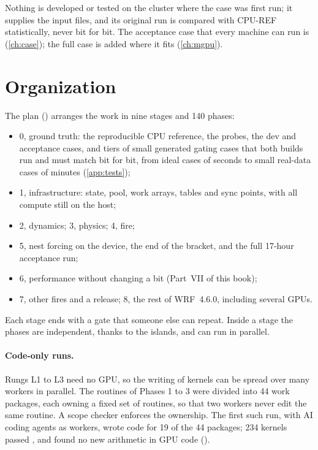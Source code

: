 Nothing is developed or tested on the cluster where the case was first run; it supplies the input files, and its
original run is compared with CPU-REF statistically, never bit for bit. The acceptance case that every machine can run
is  (\cref{ch:case}); the full case is added where it fits (\cref{ch:mgpu}).

\section{Organization}

The plan () arranges the work in nine stages and 140 phases:
\begin{itemize}
  \item 0, ground truth: the reproducible CPU reference, the probes, the dev and acceptance cases, and tiers of
    small generated gating cases that both builds run and must match bit for bit, from ideal cases of seconds to
    small real-data cases of minutes (\cref{app:tests});
  \item 1, infrastructure: state, pool, work arrays, tables and sync points, with all compute still on the host;
  \item 2, dynamics; 3, physics; 4, fire;
  \item 5, nest forcing on the device, the end of the bracket, and the full 17-hour acceptance run;
  \item 6, performance without changing a bit (Part~VII of this book);
  \item 7, other fires and a release; 8, the rest of WRF~4.6.0, including several GPUs.
\end{itemize}
Each stage ends with a gate that someone else can repeat. Inside a stage the phases are independent, thanks to the
islands, and can run in parallel.

\paragraph{Code-only runs.} Rungs L1 to L3 need no GPU, so the writing of kernels can be spread over many workers in
parallel. The routines of Phases 1 to 3 were divided into 44 work packages, each owning a fixed set of routines, so
that two workers never edit the same routine. A scope checker enforces the ownership. The first such run, with AI
coding agents as workers, wrote code for 19 of the 44 packages; 234 kernels passed , and
 found no new arithmetic in GPU code ().


